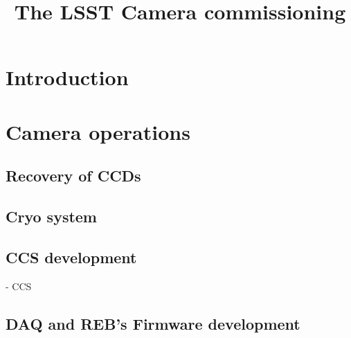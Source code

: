 \documentclass[OPS,lsstdraft,authoryear,toc]{lsstdoc}
\title{The LSST Camera commissioning}
\date{\vcsDate}
\begin{document}
\maketitle


\section{Introduction}\label{sec:introduction}






\section{Camera operations}\label{sec:operations}

\subsection{Recovery of CCDs}





\subsection{Cryo system}





\subsection{CCS development}
- CCS

\subsection{DAQ and REB's Firmware development}


\end{document}
